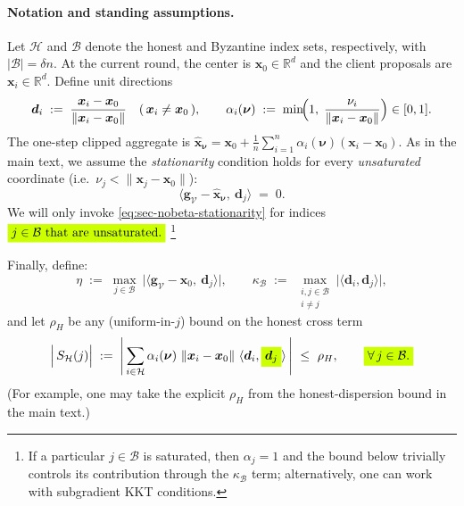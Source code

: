\documentclass{article}
\theoremstyle{plain}
\theoremstyle{definition}
\theoremstyle{remark}
\begin{document}
\paragraph{Notation and standing assumptions.}
Let $\mathcal{H}$ and $\mathcal{B}$ denote the honest and Byzantine index sets,
respectively, with $|\mathcal{B}|=\delta n$.
At the current round, the center is $\bm{x}_0\in\mathbb{R}^d$ and the client
proposals are $\bm{x}_i\in\mathbb{R}^d$.
Define unit directions
\begin{equation}
\bm{d}_i \;:=\; \frac{\bm{x}_i-\bm{x}_0}{\|\bm{x}_i-\bm{x}_0\|}
\quad (\,\bm{x}_i\neq \bm{x}_0\,),
\qquad
\alpha_i(\bm{\nu}) \;:=\; \min\!\Bigl(1,\;\frac{\nu_i}{\|\bm{x}_i-\bm{x}_0\|}\Bigr)\in[0,1].
\label{eq:sec-nobeta-defs}
\end{equation}
The one-step clipped aggregate is
$\hat{\bm{x}}_{\bm{\nu}}
= \bm{x}_0 + \frac{1}{n}\sum_{i=1}^n \alpha_i(\bm{\nu})(\bm{x}_i-\bm{x}_0)$.
As in the main text, we assume the \emph{stationarity} condition holds for every
\emph{unsaturated} coordinate (i.e.\ $\nu_j<\|\bm{x}_j-\bm{x}_0\|$):
\begin{equation}
\bigl\langle \bm{g}_{\mathcal{V}}-\hat{\bm{x}}_{\bm{\nu}},\ \bm{d}_j\bigr\rangle \;=\; 0.
\label{eq:sec-nobeta-stationarity}
\end{equation}
We will only invoke \eqref{eq:sec-nobeta-stationarity} for indices 
$
  \colorbox{fluor}{%
    $\displaystyle
        j\in\mathcal{B}	
    ~\textnormal{that are unsaturated.}
    $%
  }
$
\footnote{If a particular $j\in\mathcal{B}$ is saturated, then $\alpha_j=1$ and the bound below trivially controls its contribution through the $\kappa_{\mathcal{B}}$ term; alternatively, one can work with subgradient KKT conditions.}

Finally, define:
\begin{equation}
\eta \;:=\; \max_{j\in\mathcal{B}}\ \bigl|\langle \bm{g}_{\mathcal{V}}-\bm{x}_0,\ \bm{d}_j\rangle\bigr|,
\qquad
\kappa_{\mathcal{B}} \;:=\; \max_{\substack{i,j\in\mathcal{B}\\ i\neq j}}
\bigl|\langle \bm{d}_i,\bm{d}_j\rangle\bigr|,
\label{eq:sec-nobeta-eta-kappa}
\end{equation}
and let $\rho_H$ be any (uniform-in-$j$) bound on the honest cross term
\begin{equation}
\Bigl|\,S_{\mathcal{H}}(j)\Bigr|
\;:=\;
\Biggl|\,
\sum_{i\in\mathcal{H}}
\alpha_i(\bm{\nu})\ \|\bm{x}_i-\bm{x}_0\|\ \langle \bm{d}_i,
  \colorbox{fluor}{%
    $\displaystyle
        \bm{d}_j	
    $%
  }
\rangle
\,\Biggr|
\ \le\
\rho_H,
\qquad
  \colorbox{fluor}{%
    $\displaystyle
        \forall\,j\in\mathcal{B}.	
    $%
  }
\label{eq:sec-nobeta-rhoH}
\end{equation}
(For example, one may take the explicit $\rho_H$ from the honest-dispersion bound in the main text.)
\end{document}
